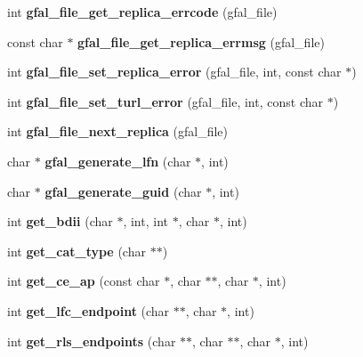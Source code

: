 \begin{CompactItemize}
\item 
int \textbf{gfal\_\-file\_\-get\_\-replica\_\-errcode} (gfal\_\-file)\label{group__internal__group_g19b575e12fff918eda15bf9933705f9a}

\item 
const char $\ast$ \textbf{gfal\_\-file\_\-get\_\-replica\_\-errmsg} (gfal\_\-file)\label{group__internal__group_ga8418371e63e1c3ee5da57b0b75a0a32}

\item 
int \textbf{gfal\_\-file\_\-set\_\-replica\_\-error} (gfal\_\-file, int, const char $\ast$)\label{group__internal__group_g5de1931dff2c84de9db70f88cfe85662}

\item 
int \textbf{gfal\_\-file\_\-set\_\-turl\_\-error} (gfal\_\-file, int, const char $\ast$)\label{group__internal__group_gafd5eb622406793e29b3aaf4d82ca399}

\item 
int \textbf{gfal\_\-file\_\-next\_\-replica} (gfal\_\-file)\label{group__internal__group_g6de434f3dc9aef814ca6d67c40febbbe}

\item 
char $\ast$ \textbf{gfal\_\-generate\_\-lfn} (char $\ast$, int)\label{group__internal__group_gcd48b57bf9659be5204319918c6f9d20}

\item 
char $\ast$ \textbf{gfal\_\-generate\_\-guid} (char $\ast$, int)\label{group__internal__group_g8311ede197e204e57029165fbc3898d6}

\item 
int \textbf{get\_\-bdii} (char $\ast$, int, int $\ast$, char $\ast$, int)\label{group__internal__group_g6a5e219ff3f38693631f8d70e96e0e08}

\item 
int \textbf{get\_\-cat\_\-type} (char $\ast$$\ast$)\label{group__internal__group_gc2d78167f7ce4514a07cc3e509584ccd}

\item 
int \textbf{get\_\-ce\_\-ap} (const char $\ast$, char $\ast$$\ast$, char $\ast$, int)\label{group__internal__group_g88f1afdfd6774bd93299b1972c0b1ce2}

\item 
int \textbf{get\_\-lfc\_\-endpoint} (char $\ast$$\ast$, char $\ast$, int)\label{group__internal__group_gc6910197c332ef4faf53fff9e028dc3a}

\item 
int \textbf{get\_\-rls\_\-endpoints} (char $\ast$$\ast$, char $\ast$$\ast$, char $\ast$, int)\label{group__internal__group_gda62dc4dfca4402c6da1fd2777a4ff26}


\end{CompactItemize}
